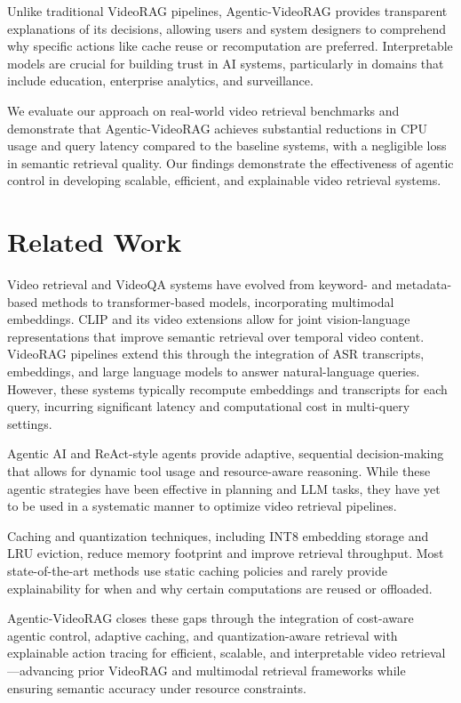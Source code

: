 \documentclass[conference,twocolumn]{IEEEtran}
\begin{document}
Unlike traditional VideoRAG pipelines, Agentic-VideoRAG provides transparent explanations of its decisions, allowing users and system designers to comprehend why specific actions like cache reuse or recomputation are preferred. Interpretable models are crucial for building trust in AI systems, particularly in domains that include education, enterprise analytics, and surveillance.

We evaluate our approach on real-world video retrieval benchmarks and demonstrate that Agentic-VideoRAG achieves substantial reductions in CPU usage and query latency compared to the baseline systems, with a negligible loss in semantic retrieval quality. Our findings demonstrate the effectiveness of agentic control in developing scalable, efficient, and explainable video retrieval systems.

\section{Related Work}
Video retrieval and VideoQA systems have evolved from keyword- and metadata-based methods to transformer-based models, incorporating multimodal embeddings. CLIP and its video extensions allow for joint vision-language representations that improve semantic retrieval over temporal video content. VideoRAG pipelines extend this through the integration of ASR transcripts, embeddings, and large language models to answer natural-language queries. However, these systems typically recompute embeddings and transcripts for each query, incurring significant latency and computational cost in multi-query settings.

Agentic AI and ReAct-style agents provide adaptive, sequential decision-making that allows for dynamic tool usage and resource-aware reasoning. While these agentic strategies have been effective in planning and LLM tasks, they have yet to be used in a systematic manner to optimize video retrieval pipelines.

Caching and quantization techniques, including INT8 embedding storage and LRU eviction, reduce memory footprint and improve retrieval throughput. Most state-of-the-art methods use static caching policies and rarely provide explainability for when and why certain computations are reused or offloaded.

Agentic-VideoRAG closes these gaps through the integration of cost-aware agentic control, adaptive caching, and quantization-aware retrieval with explainable action tracing for efficient, scalable, and interpretable video retrieval---advancing prior VideoRAG and multimodal retrieval frameworks while ensuring semantic accuracy under resource constraints.
\end{document}
